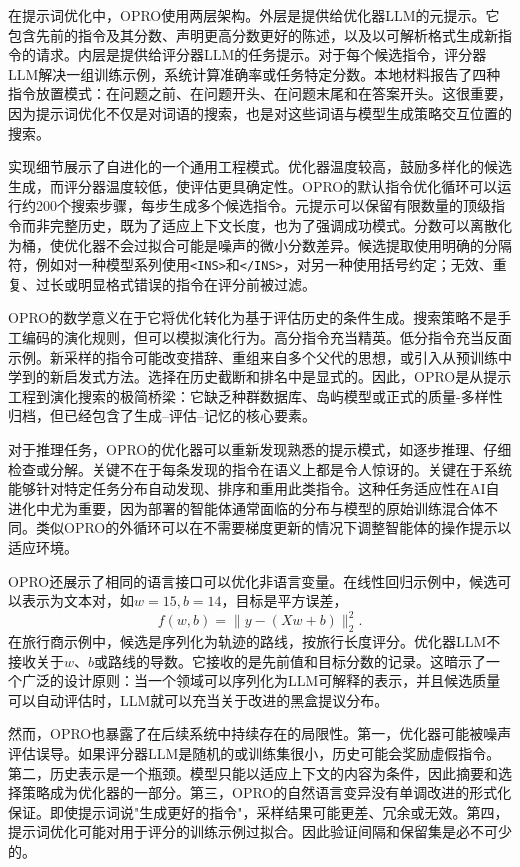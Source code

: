 在提示词优化中，OPRO使用两层架构。外层是提供给优化器LLM的元提示。它包含先前的指令及其分数、声明更高分数更好的陈述，以及以可解析格式生成新指令的请求。内层是提供给评分器LLM的任务提示。对于每个候选指令，评分器LLM解决一组训练示例，系统计算准确率或任务特定分数。本地材料报告了四种指令放置模式：在问题之前、在问题开头、在问题末尾和在答案开头。这很重要，因为提示词优化不仅是对词语的搜索，也是对这些词语与模型生成策略交互位置的搜索。

实现细节展示了自进化的一个通用工程模式。优化器温度较高，鼓励多样化的候选生成，而评分器温度较低，使评估更具确定性。OPRO的默认指令优化循环可以运行约200个搜索步骤，每步生成多个候选指令。元提示可以保留有限数量的顶级指令而非完整历史，既为了适应上下文长度，也为了强调成功模式。分数可以离散化为桶，使优化器不会过拟合可能是噪声的微小分数差异。候选提取使用明确的分隔符，例如对一种模型系列使用\texttt{<INS>}和\texttt{</INS>}，对另一种使用括号约定；无效、重复、过长或明显格式错误的指令在评分前被过滤。

OPRO的数学意义在于它将优化转化为基于评估历史的条件生成。搜索策略不是手工编码的演化规则，但可以模拟演化行为。高分指令充当精英。低分指令充当反面示例。新采样的指令可能改变措辞、重组来自多个父代的思想，或引入从预训练中学到的新启发式方法。选择在历史截断和排名中是显式的。因此，OPRO是从提示工程到演化搜索的极简桥梁：它缺乏种群数据库、岛屿模型或正式的质量-多样性归档，但已经包含了生成--评估--记忆的核心要素。

对于推理任务，OPRO的优化器可以重新发现熟悉的提示模式，如逐步推理、仔细检查或分解。关键不在于每条发现的指令在语义上都是令人惊讶的。关键在于系统能够针对特定任务分布自动发现、排序和重用此类指令。这种任务适应性在AI自进化中尤为重要，因为部署的智能体通常面临的分布与模型的原始训练混合体不同。类似OPRO的外循环可以在不需要梯度更新的情况下调整智能体的操作提示以适应环境。

OPRO还展示了相同的语言接口可以优化非语言变量。在线性回归示例中，候选可以表示为文本对，如$w=15, b=14$，目标是平方误差，
\begin{equation}
  f(w,b) = \lVert y - (Xw+b)\rVert_2^2.
\end{equation}
在旅行商示例中，候选是序列化为轨迹的路线，按旅行长度评分。优化器LLM不接收关于$w$、$b$或路线的导数。它接收的是先前值和目标分数的记录。这暗示了一个广泛的设计原则：当一个领域可以序列化为LLM可解释的表示，并且候选质量可以自动评估时，LLM就可以充当关于改进的黑盒提议分布。

然而，OPRO也暴露了在后续系统中持续存在的局限性。第一，优化器可能被噪声评估误导。如果评分器LLM是随机的或训练集很小，历史可能会奖励虚假指令。第二，历史表示是一个瓶颈。模型只能以适应上下文的内容为条件，因此摘要和选择策略成为优化器的一部分。第三，OPRO的自然语言变异没有单调改进的形式化保证。即使提示词说"生成更好的指令"，采样结果可能更差、冗余或无效。第四，提示词优化可能对用于评分的训练示例过拟合。因此验证间隔和保留集是必不可少的。

